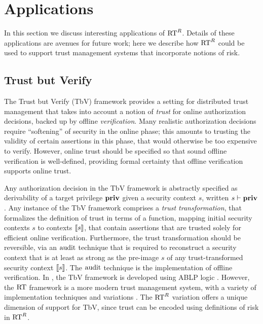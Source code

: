 \section{Applications}
\label{section-application} 

In this section we discuss interesting applications of $\text{RT}^R$.
Details of these applications are avenues for future work; here we
describe how $\text{RT}^R$ could be used to support trust management systems
that incorporate notions of risk.

\subsection{Trust but Verify}

The Trust but Verify (TbV) framework \cite{skalka-wang-sws04} provides
a setting for distributed trust management that takes into account a
notion of \emph{trust} for online authorization decisions, backed up
by offline \emph{verification}.  Many realistic authorization
decisions require ``softening'' of security in the online phase; this
amounts to trusting the validity of certain assertions in this phase,
that would otherwise be too expensive to verify.  However, online
trust should be specified so that sound offline verification is
well-defined, providing formal certainty that offline verification
supports online trust.

Any authorization decision in the TbV framework is abstractly
specified as derivability of a target privilege $\mathbf{priv}$ given a
security context $s$, written $s\vdash\mathbf{priv}$.  Any instance of the TbV
framework comprises a \emph{trust transformation}, that formalizes the
definition of trust in terms of a function, mapping initial security
contexts $s$ to contexts $\llbracket s\rrbracket$, that contain assertions that are
trusted solely for efficient online verification.  Furthermore, the
trust transformation should be reversible, via an $\text{audit}$ technique
that is required to reconstruct a security context that is at least as
strong as the pre-image $s$ of any trust-transformed security context
$\llbracket s\rrbracket$.  The $\text{audit}$ technique is the implementation of offline
verification.  In \cite{skalka-wang-sws04}, the TbV framework is
developed using ABLP logic \cite{ABLP93}.  However, the $\text{RT}$
framework is a more modern trust management system, with a variety of
implementation techniques and variations \cite{Li:2003-02}.  The
$\text{RT}^R$ variation offers a unique dimension of support for TbV, since
trust can be encoded using definitions of risk in $\text{RT}^R$.

